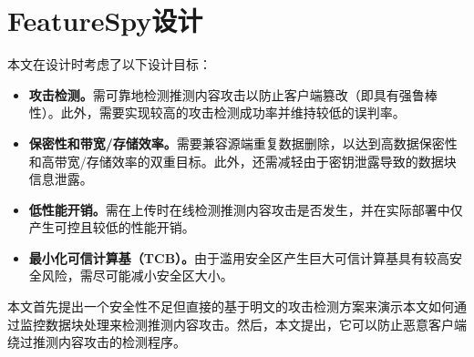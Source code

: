 \section{FeatureSpy设计}
\label{sec:featurespy-design}

本文在设计\sysnameF 时考虑了以下设计目标：

\begin{itemize}
    \item \textbf{攻击检测。}\sysnameF 需可靠地检测推测内容攻击以防止客户端篡改（即具有强鲁棒性）。此外，需要实现较高的攻击检测成功率并维持较低的误判率。
    \item \textbf{保密性和带宽/存储效率。}\sysnameF 需要兼容源端重复数据删除，以达到高数据保密性和高带宽/存储效率的双重目标。此外，\sysnameF 还需减轻由于密钥泄露导致的数据块信息泄露。
    \item \textbf{低性能开销。}\sysnameF 需在上传时在线检测推测内容攻击是否发生，并在实际部署中仅产生可控且较低的性能开销。
    \item \textbf{最小化可信计算基（TCB）。}由于滥用安全区产生巨大可信计算基具有较高安全风险\cite{lie2005TCB}，\sysnameF 需尽可能减小安全区大小。
\end{itemize}

本文首先提出一个安全性不足但直接的基于明文的攻击检测方案来演示本文如何通过监控数据块处理来检测推测内容攻击。然后，本文提出\sysnameF，它可以防止恶意客户端绕过推测内容攻击的检测程序。




